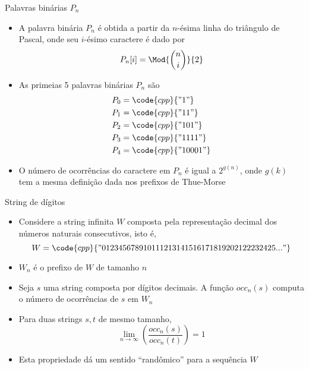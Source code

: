 \begin{frame}[fragile]{Palavras binárias $P_n$}

    \begin{itemize}
        \item A palavra binária $P_n$ é obtida a partir da $n$-ésima linha do triângulo de Pascal, 
            onde seu $i$-ésimo caractere é dado por 
            \[
                P_n[i] = \Mod{\binom{n}{i}}{2}
            \]
        \pause

        \item As primeias 5 palavras binárias $P_n$ são
        \begin{align*}
            P_0 &= \code{cpp}{"1"} \\
            P_1 &= \code{cpp}{"11"} \\
            P_2 &= \code{cpp}{"101"} \\
            P_3 &= \code{cpp}{"1111"} \\
            P_4 &= \code{cpp}{"10001"}
        \end{align*}
        \pause

        \item O número de ocorrências do caractere  em $P_n$ é igual a $2^{g(n)}$, onde 
            $g(k)$ tem a mesma definição dada nos prefixos de Thue-Morse
    \end{itemize}

\end{frame}

\begin{frame}[fragile]{String de dígitos}

    \begin{itemize}
        \item Considere a string infinita $W$ composta pela representação decimal dos números 
            naturais consecutivos, isto é,
        \[
            W = \code{cpp}{"012345678910111213141516171819202122232425..."}
        \]
        \pause

        \item $W_n$ é o prefixo de $W$ de tamanho $n$
        \pause

        \item Seja $s$ uma string composta por dígitos decimais. A função $occ_n(s)$ computa o 
            número de ocorrências de $s$ em $W_n$
        \pause

        \item Para duas strings $s, t$ de mesmo tamanho, 
        \[
            \lim_{n\to\infty} \left(\frac{occ_n(s)}{occ_n(t)}\right) = 1
        \]
        \pause

        \item Esta propriedade dá um sentido ``randômico'' para a sequência $W$
    \end{itemize}

\end{frame}

